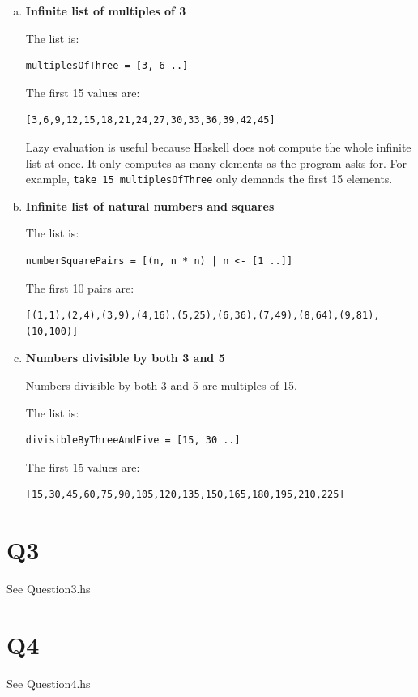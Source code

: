 \documentclass{article}
\begin{document}
\begin{enumerate}[(a)]

\item \textbf{Infinite list of multiples of 3}

The list is:
\begin{verbatim}
multiplesOfThree = [3, 6 ..]
\end{verbatim}

The first 15 values are:
\begin{verbatim}
[3,6,9,12,15,18,21,24,27,30,33,36,39,42,45]
\end{verbatim}

Lazy evaluation is useful because Haskell does not compute the whole infinite list at once. It only computes as many elements as the program asks for. For example, \texttt{take 15 multiplesOfThree} only demands the first 15 elements.

\item \textbf{Infinite list of natural numbers and squares}

The list is:
\begin{verbatim}
numberSquarePairs = [(n, n * n) | n <- [1 ..]]
\end{verbatim}

The first 10 pairs are:
\begin{verbatim}
[(1,1),(2,4),(3,9),(4,16),(5,25),(6,36),(7,49),(8,64),(9,81),(10,100)]
\end{verbatim}

\item \textbf{Numbers divisible by both 3 and 5}

Numbers divisible by both 3 and 5 are multiples of 15.

The list is:
\begin{verbatim}
divisibleByThreeAndFive = [15, 30 ..]
\end{verbatim}

The first 15 values are:
\begin{verbatim}
[15,30,45,60,75,90,105,120,135,150,165,180,195,210,225]
\end{verbatim}

\end{enumerate}

\section*{Q3}
See Question3.hs
\section*{Q4}
See Question4.hs
\end{document}

